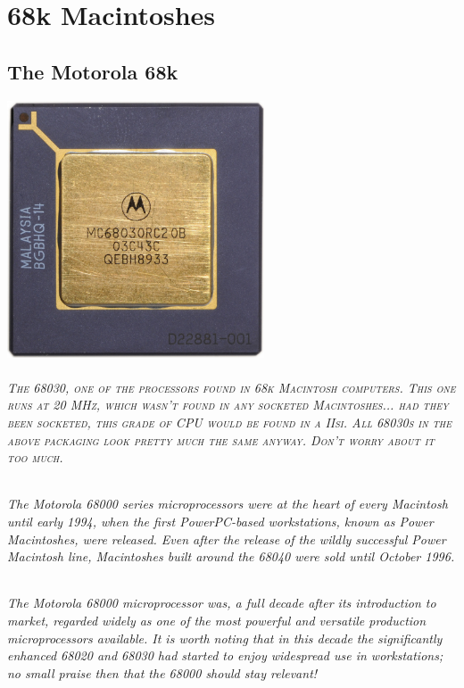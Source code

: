 
\part{68k Macintoshes}

\chapter{The Motorola 68k}

\begin{center}
\includegraphics[height=3in]{68k/68030.pdf} \\
\end{center}
\paragraph{\scriptsize{\textsc{%
The 68030, one of the processors found in 68k Macintosh computers. This one runs at %
20 MHz, which wasn't found in any socketed Macintoshes... had they been socketed, %
this grade of CPU would be found in a IIsi. All 68030s in the above packaging look %
pretty much the same anyway. Don't worry about it too much. %
}}}

\paragraph{%
The Motorola 68000 series microprocessors were at the heart of every Macintosh %
until early 1994, when the first PowerPC-based workstations, known as Power %
Macintoshes, were released. Even after the release of the wildly successful %
Power Macintosh line, Macintoshes built around the 68040 were sold until October %
1996. %
}

\paragraph{%
The Motorola 68000 microprocessor was, a full decade after its introduction to %
market, regarded widely as one of the most powerful and versatile production %
microprocessors available. It is worth noting that in this decade the %
significantly enhanced 68020 and 68030 had started to enjoy widespread use %
in workstations; no small praise then that the 68000 should stay relevant! %
}

